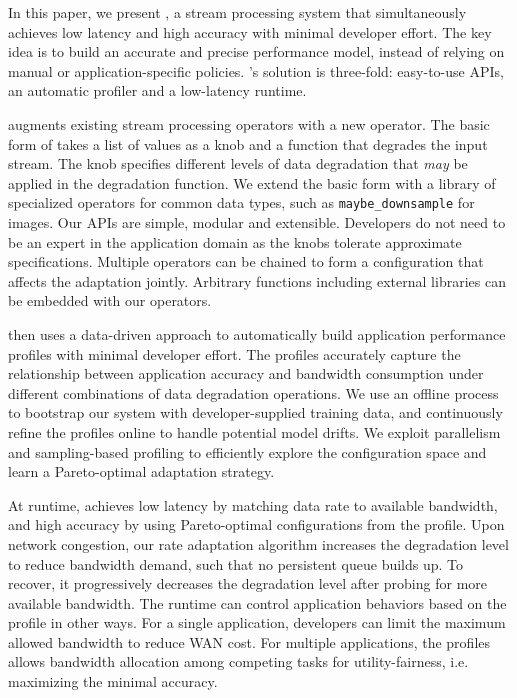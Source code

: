 In this paper, we present \sysname{}, a stream processing system that
simultaneously achieves low latency and high accuracy with minimal developer
effort. The key idea is to build an accurate and precise performance model,
instead of relying on manual or application-specific policies. \sysname{}'s
solution is three-fold: easy-to-use APIs, an automatic profiler and a
low-latency runtime.

\sysname{} augments existing stream processing operators with a new \maybe{}
operator. The basic form of \maybe{} takes a list of values as a knob and a
function that degrades the input stream. The knob specifies different levels of
data degradation that \textit{may} be applied in the degradation function.  We
extend the basic form with a library of specialized operators for common data
types, such as \texttt{maybe\_downsample} for images. Our APIs are simple,
modular and extensible. Developers do not need to be an expert in the
application domain as the knobs tolerate approximate specifications. Multiple
operators can be chained to form a configuration that affects the adaptation
jointly. Arbitrary functions including external libraries can be embedded with
our operators.

\sysname{} then uses a data-driven approach to automatically build application
performance profiles with minimal developer effort. The profiles accurately
capture the relationship between application accuracy and bandwidth consumption
under different combinations of data degradation operations. We use an offline
process to bootstrap our system with developer-supplied training data, and
continuously refine the profiles online to handle potential model drifts. We
exploit parallelism and sampling-based profiling to efficiently explore the
configuration space and learn a Pareto-optimal adaptation strategy.

At runtime, \sysname{} achieves low latency by matching data rate to available
bandwidth, and high accuracy by using Pareto-optimal configurations from the
profile. Upon network congestion, our rate adaptation algorithm increases the
degradation level to reduce bandwidth demand, such that no persistent queue
builds up. To recover, it progressively decreases the degradation level after
probing for more available bandwidth. The runtime can control application
behaviors based on the profile in other ways. For a single application,
developers can limit the maximum allowed bandwidth to reduce WAN cost. For
multiple applications, the profiles allows bandwidth allocation among competing
tasks for utility-fairness, i.e. maximizing the minimal accuracy.

